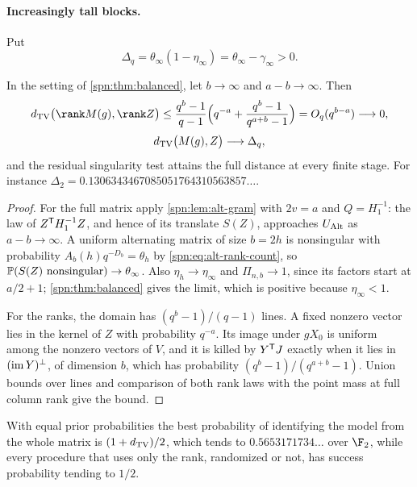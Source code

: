 \paragraph{Increasingly tall blocks.} Put
\begin{equation}\label{spn:eq:Delta-q}
 \Delta_q=\theta_\infty(1-\eta_\infty)=\theta_\infty-\gamma_\infty>0 .
\end{equation}

\begin{theorem}\label{spn:thm:nondeg-blind}
In the setting of \cref{spn:thm:balanced}, let $b\to\infty$ and $a-b\to\infty$. Then
\[
 \spnTV\bigl(\rank M(g),\rank Z\bigr)\le\frac{q^b-1}{q-1}
 \Bigl(q^{-a}+\frac{q^b-1}{q^{a+b}-1}\Bigr)=O_q(q^{b-a})\longrightarrow0,
\]
\[
 d_{\mathrm{TV}}\bigl(M(g),Z\bigr)\longrightarrow\Delta_q ,
\]
and the residual singularity test attains the full distance at every finite stage. For
instance $\Delta_2=0.1306343467085051764310563857\ldots$.
\end{theorem}

\begin{proof}
For the full matrix apply \cref{spn:lem:alt-gram} with $2v=a$ and $Q=H_1^{-1}$: the law of
$Z^{\mathsf{T}}H_1^{-1}Z$, and hence of its translate $S(Z)$, approaches $U_{\operatorname{Alt}}$ as $a-b\to\infty$.
A uniform alternating matrix of size $b=2h$ is nonsingular with probability
$A_b(h)q^{-D_b}=\theta_h$ by \eqref{spn:eq:alt-rank-count}, so
$\mathbb{P}(S(Z)\text{ nonsingular})\to\theta_\infty$. Also $\eta_h\to\eta_\infty$ and
$\Pi_{n,b}\to1$, since its factors start at $a/2+1$; \cref{spn:thm:balanced} gives the limit,
which is positive because $\eta_\infty<1$.

For the ranks, the domain has $(q^b-1)/(q-1)$ lines. A fixed nonzero vector lies in the kernel of
$Z$ with probability $q^{-a}$. Its image under $gX_0$ is uniform among the nonzero vectors of $V$,
and it is killed by $Y^{\mathsf{T}}J$ exactly when it lies in $(\operatorname{im} Y)^\perp$, of dimension $b$,
which has probability $(q^b-1)/(q^{a+b}-1)$. Union bounds over lines and comparison of both rank
laws with the point mass at full column rank give the bound.
\end{proof}

With equal prior probabilities the best probability of identifying the model from the whole
matrix is $(1+d_{\mathrm{TV}})/2$, which tends to $0.5653171734\ldots$ over $\F_2$, while every procedure
that uses only the rank, randomized or not, has success probability tending to $1/2$.

